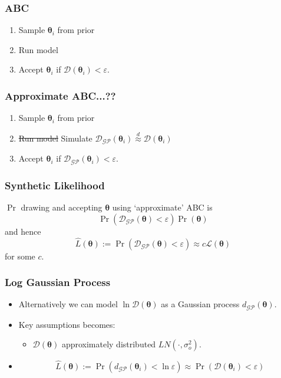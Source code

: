 \documentclass{beamer}
\begin{document}
\begin{frame}
    \frametitle{ABC}
    \begin{enumerate}
        \item Sample $\bm{\theta}_i$ from prior
        \item Run model
        \item Accept $\bm{\theta}_i$ if
              $\mathcal{D}(\bm{\theta}_i) < \varepsilon.$
    \end{enumerate}
\end{frame}

\begin{frame}
    \frametitle{Approximate ABC...??}
    \begin{enumerate}
        \item Sample $\bm{\theta}_i$ from prior
        \item \st{Run model}
              Simulate
              $\mathcal{D}_\mathcal{GP}(\bm{\theta}_i)
                  \overset{d}{\approx}\mathcal{D}(\bm{\theta}_i) $
        \item Accept $\bm{\theta}_i$ if
              \underline{
                  $\mathcal{D}_\mathcal{GP}(\bm{\theta}_i) < \varepsilon.$
              }
    \end{enumerate}
\end{frame}

\begin{frame}
    \frametitle{Synthetic Likelihood}

    $\Pr$ drawing and accepting $\bm{\theta}$ using
    `approximate' ABC is
    $$
        \Pr(\mathcal{D}_{\mathcal{GP}}(\bm{\theta}) < \varepsilon)
        \Pr(\bm{\theta})
    $$
    and hence
    $$
        \hat{L}(\bm\theta)
        := \Pr(\mathcal{D}_{\mathcal{GP}}(\bm{\theta}) < \varepsilon)
        \approx c\mathcal{L}(\bm\theta)
    $$
    for some $c.$
\end{frame}

\begin{frame}
    \frametitle{Log Gaussian Process}
    \begin{itemize}
        \item Alternatively we can model $\ln \mathcal{D}(\bm{\theta})$ as a
              Gaussian process $d_\mathcal{GP}(\bm{\theta}).$
        \item <2-> Key assumptions becomes:
              \begin{itemize}
                  \item $\mathcal{D}(\bm{\theta})$ approximately distributed
                        $LN(\cdot, \sigma^2_o).$
              \end{itemize}
        \item <3- >$$
        \hat{L}(\bm\theta)
        := \Pr(d_\mathcal{GP}(\bm{\theta}_i) < \ln\varepsilon)
        \approx \Pr(\mathcal{D}(\bm{\theta}_i) < \varepsilon)
              $$
    \end{itemize}
\end{frame}
\end{document}
